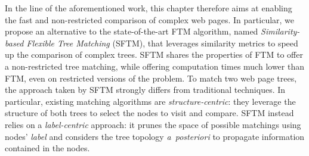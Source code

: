 



In the line of the aforementioned work, this chapter therefore aims at enabling the fast and non-restricted comparison of complex web pages.
In particular, we propose an alternative to the state-of-the-art FTM algorithm, named \emph{Similarity-based Flexible Tree Matching} (SFTM), that leverages similarity metrics to speed up the comparison of complex trees. 
SFTM shares the properties of FTM to offer a non-restricted tree matching, while offering computation times much lower than FTM, even on restricted versions of the problem.
To match two web page trees, the approach taken by SFTM strongly differs from traditional techniques.
In particular, existing matching algorithms are \textit{structure-centric}: they leverage the structure of both trees to select the nodes to visit and compare.
SFTM instead relies on a \textit{label-centric} approach: it prunes the space of possible matchings using nodes' \emph{label} and considers the tree topology \emph{a~posteriori} to propagate information contained in the nodes.

